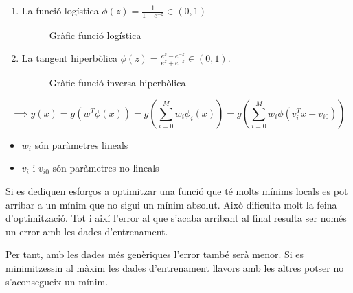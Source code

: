 \documentclass[a4paper]{article}
\begin{document}
\begin{enumerate}
	\item La funció logística $\phi(z) = \frac{1}{1 + e^{-z}} \in (0, 1)$
	\begin{figure}[H]
		\centering
		\caption{Gràfic funció logística}
		\label{fig:logistic}
	\end{figure}

	\item La tangent hiperbòlica $\phi(z) = \frac{e^z - e^{-z}}{e^z + e^{-z}} \in (0,1)$.
	
	\begin{figure}[H]
		\centering
		\caption{Gràfic funció inversa hiperbòlica}
		\label{fig:inv_hiperbol}
	\end{figure}
\end{enumerate}

$$
\implies y(x) = g(w^T \phi(x)) = g\left(\sum_{i=0}^M w_i \phi_i(x)\right) = g \left( \sum_{i=0}^M w_i \phi(v_i^T x + v_{i0}) \right)
$$
\begin{itemize}
	\item $w_i$ són paràmetres lineals
	\item $v_i$ i $v_{i0}$ són paràmetres no lineals
\end{itemize}


Si es dediquen esforços a optimitzar una funció que té molts mínims locals es pot arribar a un mínim que no sigui un mínim absolut. Això dificulta molt la feina d'optimització. Tot i així l'error al que s'acaba arribant al final resulta ser només un error amb les dades d'entrenament. 

Per tant, amb les dades més genèriques l'error també serà menor. Si es minimitzessin al màxim les dades d'entrenament llavors amb les altres potser no s'aconsegueix un mínim.
\end{document}
